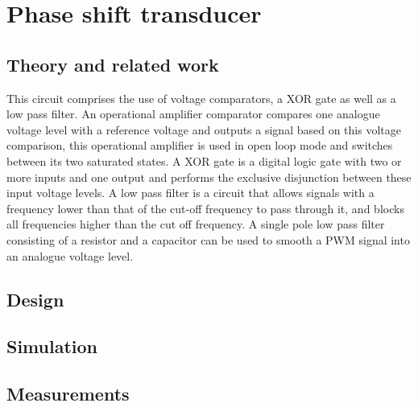 \chapter{Phase shift transducer}
\section{Theory and related work} \label{sec:literature_linear}
This circuit comprises the use of voltage comparators, a XOR gate as well as a low pass filter. An operational amplifier comparator compares one analogue voltage level with a reference voltage and outputs a signal based on this voltage comparison, this operational amplifier is used in open loop mode and switches between its two saturated states. %
A XOR gate is a digital logic gate with two or more inputs and one output and performs the exclusive disjunction between these input voltage levels. \newline
A low pass filter is a circuit that allows signals with a frequency lower than that of the cut-off frequency to pass through it, and blocks all frequencies higher than the cut off frequency. A single pole low pass filter consisting of a resistor and a capacitor can be used to smooth a PWM signal into an analogue voltage level.
\section{Design} \label{sec:design_linear}


\section{Simulation} \label{sec:simulation_linear}

\section{Measurements} \label{sec:measurements_linear}








